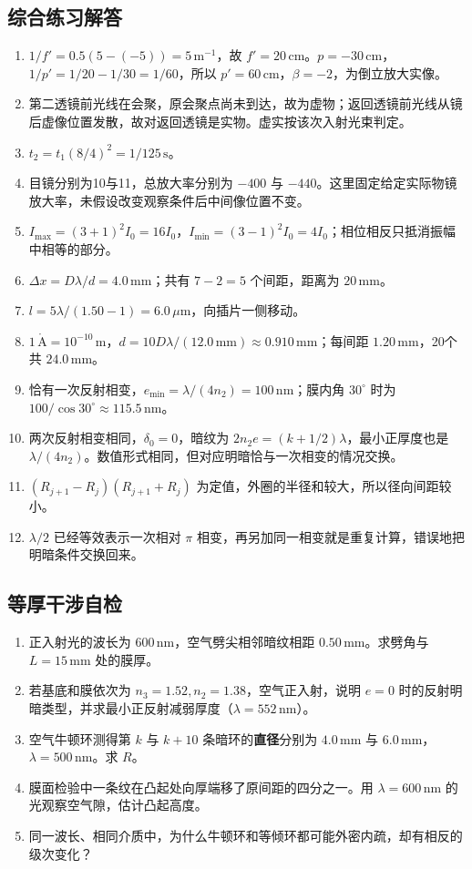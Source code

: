 \documentclass[UTF8,fontset=none,zihao=-4,a4paper]{ctexart}
\newcommand{\unit}[1]{\,\mathrm{#1}}
\begin{document}
\subsection{综合练习解答}
\begin{enumerate}
\item $1/f'=0.5(5-(-5))=5\unit{m^{-1}}$，故 $f'=20\unit{cm}$。$p=-30\unit{cm}$，$1/p'=1/20-1/30=1/60$，所以 $p'=60\unit{cm}$，$\beta=-2$，为倒立放大实像。
\item 第二透镜前光线在会聚，原会聚点尚未到达，故为虚物；返回透镜前光线从镜后虚像位置发散，故对返回透镜是实物。虚实按该次入射光束判定。
\item $t_2=t_1(8/4)^2=1/125\unit s$。
\item 目镜分别为10与11，总放大率分别为 $-400$ 与 $-440$。这里固定给定实际物镜放大率，未假设改变观察条件后中间像位置不变。
\item $I_{\max}=(3+1)^2I_0=16I_0$，$I_{\min}=(3-1)^2I_0=4I_0$；相位相反只抵消振幅中相等的部分。
\item $\Delta x=D\lambda/d=4.0\unit{mm}$；共有 $7-2=5$ 个间距，距离为 $20\unit{mm}$。
\item $l=5\lambda/(1.50-1)=6.0\,\mu\mathrm m$，向插片一侧移动。
\item $1\unit{\mathring A}=10^{-10}\unit m$，$d=10D\lambda/(12.0\unit{mm})\approx0.910\unit{mm}$；每间距 $1.20\unit{mm}$，20个共 $24.0\unit{mm}$。
\item 恰有一次反射相变，$e_{\min}=\lambda/(4n_2)=100\unit{nm}$；膜内角 $30^\circ$ 时为 $100/\cos30^\circ\approx115.5\unit{nm}$。
\item 两次反射相变相同，$\delta_0=0$，暗纹为 $2n_2e=(k+1/2)\lambda$，最小正厚度也是 $\lambda/(4n_2)$。数值形式相同，但对应明暗恰与一次相变的情况交换。
\item $(R_{j+1}-R_j)(R_{j+1}+R_j)$ 为定值，外圈的半径和较大，所以径向间距较小。
\item $\lambda/2$ 已经等效表示一次相对 $\pi$ 相变，再另加同一相变就是重复计算，错误地把明暗条件交换回来。
\end{enumerate}

\subsection{等厚干涉自检}
\begin{enumerate}
\item 正入射光的波长为 $600\unit{nm}$，空气劈尖相邻暗纹相距 $0.50\unit{mm}$。求劈角与 $L=15\unit{mm}$ 处的膜厚。
\item 若基底和膜依次为 $n_3=1.52,n_2=1.38$，空气正入射，说明 $e=0$ 时的反射明暗类型，并求最小正反射减弱厚度（$\lambda=552\unit{nm}$）。
\item 空气牛顿环测得第 $k$ 与 $k+10$ 条暗环的\textbf{直径}分别为 $4.0\unit{mm}$ 与 $6.0\unit{mm}$，$\lambda=500\unit{nm}$。求 $R$。
\item 膜面检验中一条纹在凸起处向厚端移了原间距的四分之一。用 $\lambda=600\unit{nm}$ 的光观察空气隙，估计凸起高度。
\item 同一波长、相同介质中，为什么牛顿环和等倾环都可能外密内疏，却有相反的级次变化？
\end{enumerate}
\end{document}
